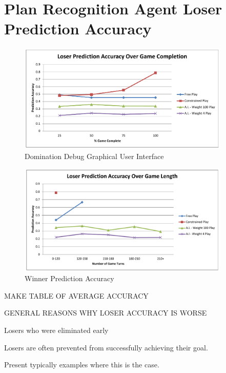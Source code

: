 \documentclass[parskip]{cs4rep}
\begin{document}
\section{Plan Recognition Agent Loser Prediction Accuracy}

\newpage

\begin{figure}[h]
\centerline{
\includegraphics[width=0.9\textwidth]{images/loser-game-complete.pdf}
}
\caption{Domination Debug Graphical User Interface}
\label{fig:dom-debug-gui}
\end{figure} 

\begin{figure}[h]
\centerline{
\includegraphics[width=0.9\textwidth]{images/loser-game-length.pdf}
}
\caption{Winner Prediction Accuracy}
\label{fig:dom-debug-gui}
\end{figure}

\newpage

MAKE TABLE OF AVERAGE ACCURACY

GENERAL REASONS WHY LOSER ACCURACY IS WORSE

Losers who were eliminated early

Losers are often prevented from successfully achieving their goal.

Present typically examples where this is the case.
\end{document}
